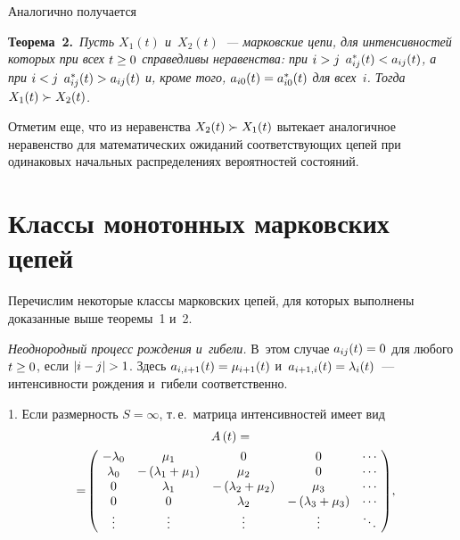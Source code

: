 \begin{multicols}{2}
\smallskip

Аналогично получается

\smallskip

\noindent
\textbf{Теорема~2.}\ \textit{Пусть $X_1(t)$ и~$X_2(t)$~--- марковские цепи, для 
интенсивностей которых  при всех $t\hm \ge 0$ справедливы неравенства: при $i\hm>j$ 
$a^*_{ij}(t)\hm< a_{ij}(t)$, а при $i\hm<j$ $a^*_{ij}(t)\hm>a_{ij}(t)$ и, кроме того,   
$a_{i0}(t)\hm=a^*_{i0}(t)$ для всех~$i$. Тогда  $X_1(t) \hm\succ X_2(t)$.
}

\smallskip

Отметим еще, что из неравенства $X_2(t)\hm \succ X_1(t)$ вытекает аналогичное 
неравенство для математических ожиданий соответствующих цепей при одинаковых 
начальных распределениях вероятностей состояний.


\section{Классы монотонных марковских цепей}


Перечислим некоторые классы марковских цепей, для которых выполнены доказанные 
выше тео\-ре\-мы~1 и~2.

\smallskip

  \textit{Неоднородный процесс рождения и~гибели.} В~этом 
случае
$a_{ij}(t)\hm=0$ для любого $t \hm\ge 0$, если $|i\hm-j|\hm>1$. Здесь
$a_{i,i+1}(t)\hm=\mu_{i+1}(t)$ и~$a_{i+1,i}(t)\hm=\lambda_{i}(t)$~--- интенсивности 
рождения и~гибели соответственно.

1. Если размерность $S=\infty$, т.\,е.\ матрица интенсивностей имеет вид
\begin{multline*}
A\left( t\right) ={}\\
{}=\!\left(\!
\begin{array}{ccccc}
-\lambda_0                 & \mu_1                                                   
& 0                                 & 0                                                 
& \cdots \\
 \lambda_0                 & -\left( \lambda_1 +\mu_1\right)                         
& \mu_2                             & 0                                                 
& \cdots \\
 0                         & \lambda_1                                               
& -\left( \lambda_2 +\mu_2\right)   & \mu_3                                             
& \cdots \\
 0                         & 0                                                       
& \lambda_2                         & -\left( \lambda_3 +\mu_3\right)                   
& \cdots \\
\vdots                     & \vdots                                                  
& \vdots                            & \vdots                                            
& \ddots \\
\end{array}\!
\right)\!,\hspace*{-3.02283pt}
\end{multline*}



\end{multicols}
